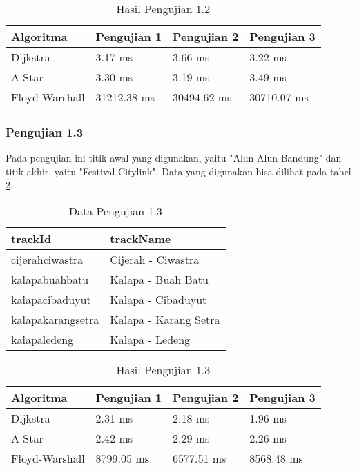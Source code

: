 \renewcommand{\arraystretch}{1.8}
\begin{table}[H]
\centering
\caption{Hasil Pengujian 1.2}
\label{tab:hasiluji1.2}
{\large
\begin{tabular}{|l|l|l|l|}
\hline
\textbf{Algoritma} & \textbf{Pengujian 1} & \textbf{Pengujian 2} & \textbf{Pengujian 3} \\ \hline
Dijkstra           & 3.17 ms              & 3.66 ms             & 3.22 ms              \\ \hline
A-Star            & 3.30 ms              & 3.19 ms              & 3.49 ms              \\ \hline
Floyd-Warshall     & 31212.38 ms              & 30494.62 ms               & 30710.07 ms              \\ \hline
\end{tabular}
}
\end{table}

\subsubsection{Pengujian 1.3}
Pada pengujian ini titik awal yang digunakan, yaitu "Alun-Alun Bandung" dan titik akhir, yaitu "Festival Citylink". Data yang digunakan bisa dilihat pada tabel \ref{tab:data1.3}.

\renewcommand{\arraystretch}{1.8}
\begin{table}[H]
\centering
\caption{Data Pengujian 1.3}
\label{tab:data1.3}
{\large
\begin{tabular}{|l|l|}
\hline
\textbf{trackId}       & \textbf{trackName}             \\ \hline
cijerahciwastra & Cijerah - Ciwastra \\ \hline
kalapabuahbatu & Kalapa - Buah Batu \\ \hline
kalapacibaduyut   & Kalapa - Cibaduyut     \\ \hline
kalapakarangsetra        & Kalapa - Karang Setra             \\ \hline
kalapaledeng        & Kalapa - Ledeng             \\ \hline
\end{tabular}
}
\end{table}

\renewcommand{\arraystretch}{1.8}
\begin{table}[H]
\centering
\caption{Hasil Pengujian 1.3}
\label{tab:hasiluji1.3}
{\large
\begin{tabular}{|l|l|l|l|}
\hline
\textbf{Algoritma} & \textbf{Pengujian 1} & \textbf{Pengujian 2} & \textbf{Pengujian 3} \\ \hline
Dijkstra           & 2.31 ms              & 2.18 ms             & 1.96 ms              \\ \hline
A-Star            & 2.42 ms              & 2.29 ms              & 2.26 ms              \\ \hline
Floyd-Warshall     & 8799.05 ms              & 6577.51 ms               & 8568.48 ms              \\ \hline
\end{tabular}
}
\end{table}

